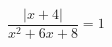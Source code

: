 \begin{ex}[type=equation]
	\begin{condition}
		$\dfrac{\big|x + 4\big|}{x^2 + 6x + 8}= 1$
	\end{condition}
	\answer{$\left\{ -1 \right\}$}
\end{ex}